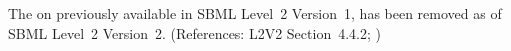 The   on \Unit previously available in SBML
Level~2 Version~1, has been removed as of SBML Level~2 Version~2.
(References: L2V2 Section~4.4.2; )
